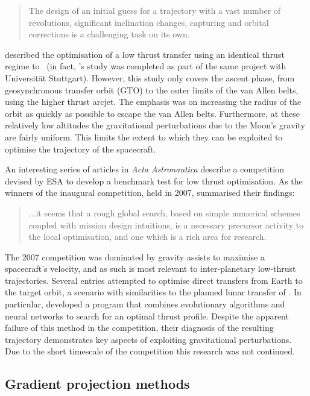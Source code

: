 \begin{quotation}The design of an initial guess for a trajectory with a vast number of revolutions, significant inclination changes, capturing and orbital corrections is a challenging task on its own.\end{quotation}

\textcite{Letterio_thesis} described the optimisation of a low thrust transfer using an identical thrust regime to \BW\ (in fact, \citeauthor{Letterio_thesis}'s study was completed as part of the same project with Universit\"{a}t Stuttgart). However, this study only covers the ascent phase, from geosynchronous transfer orbit (GTO) to the outer limits of the van Allen belts, using the higher thrust arcjet. The emphasis was on increasing the radius of the orbit as quickly as possible to escape the van Allen belts. Furthermore, at these relatively low altitudes the gravitational perturbations due to the Moon's gravity are fairly uniform. This limits the extent to which they can be exploited to optimise the trajectory of the spacecraft.

An interesting series of articles in \emph{Acta Astronautica} describe a competition devised by ESA to develop a benchmark test for low thrust optimisation. As the winners of the inaugural competition, held in 2007, \textcite{Petropoulos2007} summarised their findings: 

\begin{quotation}...it seems that a rough global search, based on simple numerical schemes coupled with mission design intuitions, is a necessary precursor activity to the local optimisation, and one which is a rich area for research.\end{quotation}

The 2007 competition was dominated by gravity assists to maximise a spacecraft's velocity, and as such is most relevant to inter-planetary low-thrust trajectories. Several entries attempted to optimise direct transfers from Earth to the target orbit, a scenario with similarities to the planned lunar transfer of \BW. In particular, \textcite{Dachwald2007} developed a program that combines evolutionary algorithms and neural networks to search for an optimal thrust profile. Despite the apparent failure of this method in the competition, their diagnosis of the resulting trajectory demonstrates key aspects of exploiting gravitational perturbations. Due to the short timescale of the competition this research was not continued.

\subsection{Gradient projection methods}\label{sub:Gradient-methods-lit}
